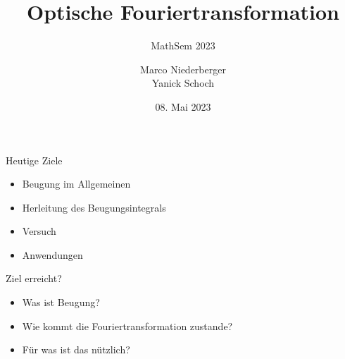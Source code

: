 \documentclass{beamer}
\title{Optische Fouriertransformation}
\subtitle{MathSem 2023}
\author{Marco Niederberger \texorpdfstring{\\}{} Yanick Schoch}
\institute{OST - Ostschweizer Fachhochschule}
\date{08. Mai 2023}
\begin{document}
\begin{frame}[plain]
\end{frame}

\begin{frame}
    \maketitle %
\end{frame}

\begin{frame}{Heutige Ziele}
    \begin{itemize}
        \item Beugung im Allgemeinen
        \item Herleitung des Beugungsintegrals
        \item Versuch
        \item Anwendungen
    \end{itemize}
\end{frame}





\begin{frame}{Ziel erreicht?}
    \begin{itemize}
        \item Was ist Beugung?
        \item Wie kommt die Fouriertransformation zustande?
        \item Für was ist das nützlich?
    \end{itemize}
\end{frame}


\end{document}
